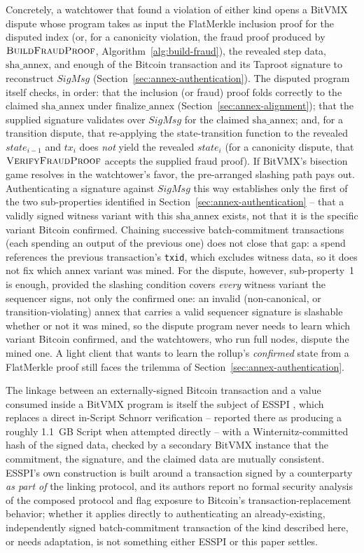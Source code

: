 Concretely, a watchtower that found a violation of either kind opens a
BitVMX dispute whose program takes as input the FlatMerkle inclusion proof
for the disputed index (or, for a canonicity violation, the fraud proof
produced by $\textsc{BuildFraudProof}$, Algorithm~\ref{alg:build-fraud}), the
revealed step data, $\mathrm{sha\_annex}$, and enough of the Bitcoin
transaction and its Taproot signature to reconstruct $\mathit{SigMsg}$
(Section~\ref{sec:annex-authentication}). The disputed program itself
checks, in order: that the inclusion (or fraud) proof folds correctly to
the claimed $\mathrm{sha\_annex}$ under $\mathrm{finalize\_annex}$
(Section~\ref{sec:annex-alignment}); that the supplied signature validates
over $\mathit{SigMsg}$ for the claimed $\mathrm{sha\_annex}$; and, for a
transition dispute, that re-applying the state-transition function to the
revealed $\mathit{state}_{i-1}$ and $\mathit{tx}_i$ does \emph{not} yield
the revealed $\mathit{state}_i$ (for a canonicity dispute, that
$\textsc{VerifyFraudProof}$ accepts the supplied fraud proof). If BitVMX's
bisection game resolves in the watchtower's favor, the pre-arranged
slashing path pays out. Authenticating a signature against $\mathit{SigMsg}$
this way establishes only the first of the two sub-properties identified in
Section~\ref{sec:annex-authentication} -- that a validly signed witness
variant with this $\mathrm{sha\_annex}$ exists, not that it is the specific
variant Bitcoin confirmed. Chaining successive batch-commitment
transactions (each spending an output of the previous one) does not close
that gap: a spend references the previous transaction's \texttt{txid},
which excludes witness data, so it does not fix which annex variant was
mined. For the dispute, however, sub-property~1 is enough, provided the
slashing condition covers \emph{every} witness variant the sequencer
signs, not only the confirmed one: an invalid (non-canonical, or
transition-violating) annex that carries a valid sequencer signature is
slashable whether or not it was mined, so the dispute program never needs
to learn which variant Bitcoin confirmed, and the watchtowers, who run full
nodes, dispute the mined one. A light client that wants to learn the
rollup's \emph{confirmed} state from a FlatMerkle proof still faces the
trilemma of Section~\ref{sec:annex-authentication}.

The linkage between an externally-signed Bitcoin transaction and a value
consumed inside a BitVMX program is itself the subject of ESSPI
\citep{lerner2025esspi}, which replaces a direct in-Script Schnorr
verification -- reported there as producing a roughly 1.1~GB Script when
attempted directly -- with a Winternitz-committed hash of the signed data,
checked by a secondary BitVMX instance that the commitment, the signature,
and the claimed data are mutually consistent. ESSPI's own construction is
built around a transaction signed by a counterparty \emph{as part of} the
linking protocol, and its authors report no formal security analysis of
the composed protocol and flag exposure to Bitcoin's transaction-replacement
behavior; whether it applies directly to authenticating an
already-existing, independently signed batch-commitment transaction of the
kind described here, or needs adaptation, is not something either ESSPI or
this paper settles.

